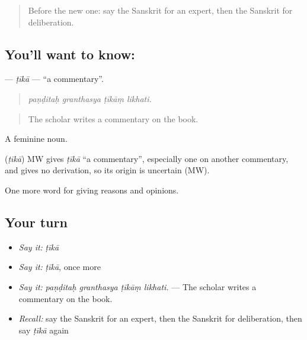\label{lesson:SA-C364-tika}



\begin{quote}
Before the new one: say the Sanskrit for an expert, then the Sanskrit for deliberation.
\end{quote}

\subsection*{You'll want to know: }
\textbf{} — \emph{ṭīkā} — \textquotedblleft{}a commentary\textquotedblright{}.

\begin{quote}
   
\end{quote}

\begin{quote}
\emph{paṇḍitaḥ granthasya ṭīkāṃ likhati.}
\end{quote}

\begin{quote}
The scholar writes a commentary on the book.
\end{quote}

A feminine noun.

\begin{cousinweb}
\textbf{} (\emph{ṭīkā}) MW gives \emph{ṭīkā} \textquotedblleft{}a commentary\textquotedblright{}, especially one on another commentary, and gives no derivation, so its origin is uncertain (MW).
\end{cousinweb}

\begin{grammarlens}[title={What you've built}]
One more word for giving reasons and opinions.
\end{grammarlens}

\subsection*{Your turn}
\begin{itemize}
\raggedright
  \item \emph{Say it:} \emph{ṭīkā}
  \item \emph{Say it:} \emph{ṭīkā}, once more
  \item \emph{Say it:} \emph{paṇḍitaḥ granthasya ṭīkāṃ likhati.} — The scholar writes a commentary on the book.
  \item \emph{Recall:} say the Sanskrit for an expert, then the Sanskrit for deliberation, then say \emph{ṭīkā} again
\end{itemize}


